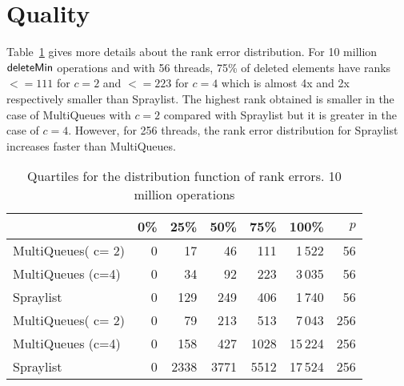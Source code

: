\documentclass[a4paper,12pt]{article}
\newcommand{\Id}[1]{\ensuremath{\text{{\sf #1}}}}
\begin{document}
\section{Quality}
Table~\ref{tab:quality} gives more details about the rank error distribution. For 10 million \Id{deleteMin} operations and with 56 threads, 75\% of deleted elements have ranks $<= 111$ for $c=2$ and $<=223$ for $c=4$ which is almost 4x and 2x respectively smaller than Spraylist. The highest rank obtained is smaller in the case of MultiQueues with $c=2$ compared with Spraylist but it is greater in the case of $c=4$. However, for 256 threads, the rank error distribution for Spraylist increases faster than MultiQueues.
\begin{table}[h]
\centering
  \begin{tabular}{ l | r   r   r   r  r| r}
    \hline
 \ & 0\% & 25\% & 50\% & 75\% & 100\% & $p$\\ 
    \hline
MultiQueues( c= 2) & 0 & 17  & 46 & 111 & 1\,522 & 56 \\
MultiQueues (c=4) & 0 & 34 & 92 & 223 & 3\,035 & 56\\
Spraylist & 0 & 129 & 249 & 406 & 1\,740 & 56\\\hline
MultiQueues( c= 2) & 0 & 79 & 213 & 513 & 7\,043 & 256\\

MultiQueues (c=4) & 0 & 158 & 427 & 1028 & 15\,224 & 256\\

Spraylist & 0 & 2338 & 3771 & 5512 & 17\,524 & 256\\
    \hline
  \end{tabular}
\caption{Quartiles for the distribution function of rank errors. 10 million operations} \label{tab:quality56} 
\label{tab:quality}
\end{table}
\end{document}
